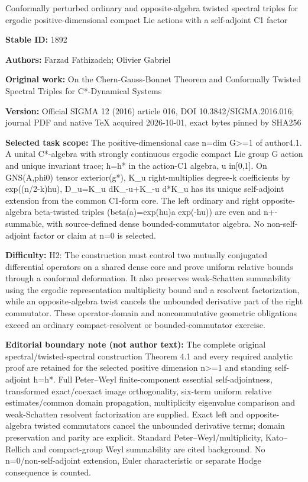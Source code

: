 \documentclass[11pt]{article}
\numberwithin{equation}{section}
\begin{document}
\begin{center}\Large Conformally perturbed ordinary and opposite-algebra twisted spectral triples for ergodic positive-dimensional compact Lie actions with a self-adjoint C1 factor\end{center}
\noindent\textbf{Stable ID:} 1892\par
\noindent\textbf{Authors:} Farzad Fathizadeh; Olivier Gabriel\par
\noindent\textbf{Original work:} On the Chern-Gauss-Bonnet Theorem and Conformally Twisted Spectral Triples for C*\allowbreak{}-Dynamical Systems\par
\noindent\textbf{Version:} Official SIGMA 12 (2016) article 016, DOI 10.3842/SIGMA.2016.016; journal PDF and native TeX acquired 2026-10-01, exact bytes pinned by SHA256\par
\noindent\textbf{Selected task scope:} The positive-dimensional case n=\allowbreak{}dim G>=\allowbreak{}1 of author4.1. A unital C*\allowbreak{}-algebra with strongly continuous ergodic compact Lie group G action and unique invariant trace; h=\allowbreak{}h*\allowbreak{} in the action-C1 algebra, u in[0,1]. On GNS(A,phi0) tensor exterior(g*\allowbreak{}), K\_u right-multiplies degree-k coefficients by exp((n/2-k)hu), D\_u=\allowbreak{}K\_u dK\_-u+\allowbreak{}K\_-u d*\allowbreak{}K\_u has its unique self-adjoint extension from the common C1-form core. The left ordinary and right opposite-algebra beta-twisted triples (beta(a)=\allowbreak{}exp(hu)a exp(-hu)) are even and n+\allowbreak{}-summable, with source-defined dense bounded-commutator algebra. No non-self-adjoint factor or claim at n=\allowbreak{}0 is selected.\par
\noindent\textbf{Difficulty:} H2: The construction must control two mutually conjugated differential operators on a shared dense core and prove uniform relative bounds through a conformal deformation. It also preserves weak-Schatten summability using the ergodic representation multiplicity bound and a resolvent factorization, while an opposite-algebra twist cancels the unbounded derivative part of the right commutator. These operator-domain and noncommutative geometric obligations exceed an ordinary compact-resolvent or bounded-commutator exercise.\par
\noindent\textbf{Editorial boundary note (not author text):} The complete original spectral/twisted-spectral construction Theorem 4.1 and every required analytic proof are retained for the selected positive dimension n>=\allowbreak{}1 and standing self-adjoint h=\allowbreak{}h*\allowbreak{}. Full Peter–Weyl finite-component essential self-adjointness, transformed exact/coexact image orthogonality, six-term uniform relative estimates/common domain propagation, multiplicity eigenvalue comparison and weak-Schatten resolvent factorization are supplied. Exact left and opposite-algebra twisted commutators cancel the unbounded derivative terms; domain preservation and parity are explicit. Standard Peter–Weyl/multiplicity, Kato–Rellich and compact-group Weyl summability are cited background. No n=\allowbreak{}0/non-self-adjoint extension, Euler characteristic or separate Hodge consequence is counted.\par
\end{document}
